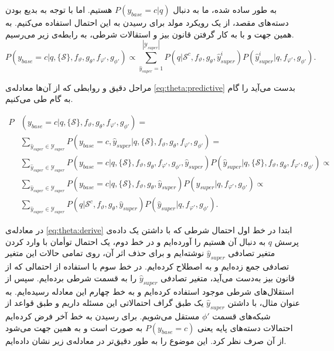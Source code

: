 به طور ساده شده، ما به دنبال 
$P(y_{base}=c|q)$
هستیم. اما با توجه به بدیع بودن دسته‌های مقصد، از یک رویکرد مولد برای رسیدن به این احتمال استفاده می‌کنیم. به همین جهت و با به کار گرفتن قانون بیز و استقالات شرطی، به رابطه‌ی زیر می‌رسیم.
\begin{equation}
	\label{eq:theta:predictive}
	P(y_{base}=c|q,\{\mathcal{S}\},f_\vartheta,g_\theta,f_{\varphi'},g_{\phi'}) \propto \sum_{\hat{y}_{super}=1}^{|\mathcal{Y}_{super}|}P(q|\mathcal{S}^c,f_\vartheta,g_\theta,\hat{y}_{super}^i)P(\hat{y}_{super}^i|q,f_{\varphi'},g_{\phi'}).
\end{equation}

مراحل دقیق و روابطی که از آن‌ها معادله‌ی 
\ref{eq:theta:predictive}
بدست‌ می‌آید را گام به گام طی می‌کنیم. 

\begin{equation}
	\begin{split} \label{eq:theta:derive}
		P&(y_{base}=c|q,\{\mathcal{S}\},f_\vartheta,g_\theta,f_{\varphi'},g_{\phi'}) =\\
		& \sum_{\hat{y}_{super}\in\mathcal{Y}_{super}}
		P(y_{base}=c,\hat{y}_{super}|q,\{\mathcal{S}\},f_\vartheta,g_\theta,f_{\varphi'},g_{\phi'}) =\\
		& \sum_{\hat{y}_{super}\in\mathcal{Y}_{super}}
		P(y_{base}=c|q,\{\mathcal{S}\},f_\vartheta,g_\theta,f_{\varphi'},g_{\phi'},\hat{y}_{super})
		P(\hat{y}_{super}|q,\{\mathcal{S}\},f_\vartheta,g_\theta,f_{\varphi'},g_{\phi'}) \propto\\
		& \sum_{\hat{y}_{super}\in\mathcal{Y}_{super}}
		P(y_{base}=c|q,\{\mathcal{S}\},f_\vartheta,g_\theta,\hat{y}_{super})
		P(\hat{y}_{super}|q,f_{\varphi'},g_{\phi'}) \propto \\
		& \sum_{\hat{y}_{super}\in\mathcal{Y}_{super}}
		P(q|\mathcal{S}^c,f_\vartheta,g_\theta,\hat{y}_{super})
		P(\hat{y}_{super}|q,f_{\varphi'},g_{\phi'}).
	\end{split}
\end{equation}

در معادله‌ی 
\ref{eq:theta:derive}
ابتدا در خط اول احتمال شرطی که با داشتن یک داده‌ی پرسش 
$q$
به دنبال آن هستیم را آورده‌ایم و در خط دوم، یک احتمال توأمان با وارد کردن متغیر تصادفی 
$\hat{y}_{super}$
نوشته‌ایم و برای حذف اثر آن، روی تمامی حالات این متغیر تصادفی جمع زده‌ایم و به اصطلاح 
کرده‌ایم. در خط سوم با استفاده از 
 احتمالی که از قانون بیز به‌دست می‌آید، متغیر تصادفی 
$\hat{y}_{super}$
را به قسمت شرطی برده‌ایم. سپس از استقلال‌های شرطی موجود استفاده کرده‌ایم و به خط چهارم این معادله رسیده‌ایم. به عنوان مثال، با داشتن 
$\hat{y}_{super}$
یک 
طبق گراف احتمالاتی این مسئله داریم و طبق قواعد 
از شبکه‌های قسمت 
$\phi'$
مستقل می‌شویم. برای رسیدن به خط آخر فرض کرده‌ایم احتمالات دسته‌های پایه یعنی 
$P(y_{base}=c)$
به صورت
 است و به همین جهت می‌شود از آن صرف نظر کرد. این موضوع را به طور دقیق‌تر در معادله‌ی زیر نشان داده‌ایم.
 
